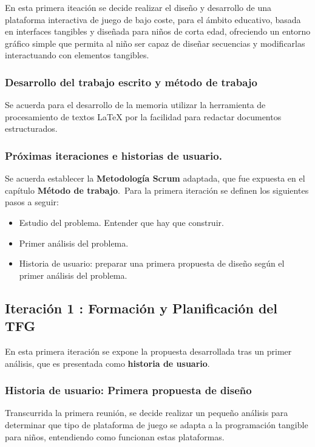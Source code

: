 En esta primera iteación se decide realizar el diseño y desarrollo de una plataforma interactiva de juego de bajo coste, para el ámbito educativo, basada en interfaces tangibles y diseñada para niños de corta edad, ofreciendo un entorno gráfico simple que permita al niño ser capaz de diseñar secuencias y modificarlas interactuando con elementos tangibles.\

\subsubsection{Desarrollo del trabajo escrito y método de trabajo}
Se acuerda para el desarrollo de la memoria utilizar la herramienta de procesamiento de textos \LaTeX{} por la facilidad para redactar documentos estructurados.





\subsubsection{Próximas iteraciones e historias de usuario.}
Se acuerda establecer la \textbf{Metodología Scrum} adaptada, que fue expuesta en el capítulo \textbf{Método de trabajo}.\
Para la primera iteración se definen los siguientes pasos a seguir:
\begin{itemize}
\item Estudio del problema. Entender que hay que construir.
\item Primer análisis del problema.
\item Historia de usuario: preparar una primera propuesta de diseño según el primer análisis del problema.
\end{itemize}


\subsection{Iteración 1 : Formación y Planificación del TFG }
En esta primera iteración se expone la propuesta desarrollada tras un primer análisis, que es presentada como \textbf{historia de usuario}. 

\subsubsection{Historia de usuario: Primera propuesta de diseño}
Transcurrida la primera reunión, se decide realizar un pequeño análisis para determinar que tipo de plataforma de juego se adapta a la programación tangible para niños, entendiendo como funcionan estas plataformas.

